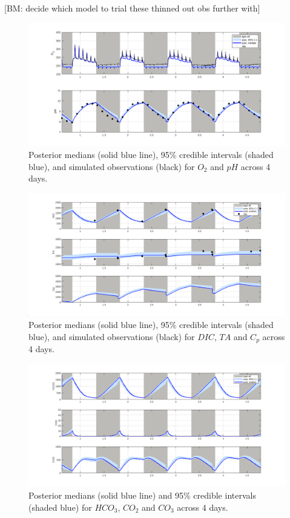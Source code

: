 \documentclass{ruthesis}
\begin{document}
[BM: decide which model to trial these thinned out obs further with]

\begin{figure}
	\centerline{\includegraphics[width=1.2\textwidth]{images_microalgae/plots_test/O2_pH}}
	\caption[.]{Posterior medians (solid blue line), 95\% credible intervals (shaded blue), and simulated observations (black) for $O_2$ and $pH$ across 4 days.}
	\label{fig:micro_exp_test_O2_pH}
\end{figure}

\begin{figure}
	\centerline{\includegraphics[width=1.2\textwidth]{images_microalgae/plots_test/DIC_TA_Cp}}
	\caption[.]{Posterior medians (solid blue line), 95\% credible intervals (shaded blue), and simulated observations (black) for $DIC$, $TA$ and $C_p$ across 4 days.}
	\label{fig:micro_exp_test_DIC_TA_Cp}
\end{figure}

\begin{figure}
	\centerline{\includegraphics[width=1.2\textwidth]{images_microalgae/plots_test/carbon}}
	\caption[.]{Posterior medians (solid blue line) and 95\% credible intervals (shaded blue) for $HCO_3$, $CO_2$ and $CO_3$ across 4 days.}
	\label{fig:micro_exp_test_carbon}
\end{figure}
\end{document}
